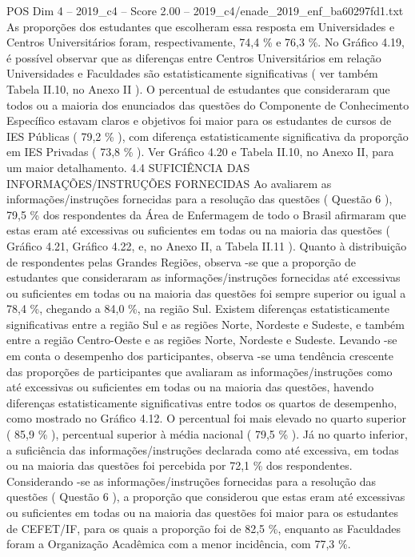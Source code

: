 \begin{textsample}{POS Dim 4 – 2019\_c4 – Score 2.00 – 2019\_c4/enade\_2019\_enf\_ba60297fd1.txt}
As proporções dos estudantes que escolheram essa resposta em Universidades e Centros Universitários foram, respectivamente, 74,4 \% e 76,3 \%.
No Gráfico 4.19, é possível observar que as diferenças entre Centros Universitários em relação Universidades e Faculdades são estatisticamente significativas ( ver também Tabela II.10, no Anexo II ).
O percentual de estudantes que consideraram que todos ou a maioria dos enunciados das questões do Componente de Conhecimento Específico estavam claros e objetivos foi maior para os estudantes de cursos de IES Públicas ( 79,2 \% ), com diferença estatisticamente significativa da proporção em IES Privadas ( 73,8 \% ).
Ver Gráfico 4.20 e Tabela II.10, no Anexo II, para um maior detalhamento. 4.4 SUFICIÊNCIA DAS INFORMAÇÕES/INSTRUÇÕES FORNECIDAS Ao avaliarem as informações/instruções fornecidas para a resolução das questões ( Questão 6 ), 79,5 \% dos respondentes da Área de Enfermagem de todo o Brasil afirmaram que estas eram até excessivas ou suficientes em todas ou na maioria das questões ( Gráfico 4.21, Gráfico 4.22, e, no Anexo II, a Tabela II.11 ).
Quanto à distribuição de respondentes pelas Grandes Regiões, observa -se que a proporção de estudantes que consideraram as informações/instruções fornecidas até excessivas ou suficientes em todas ou na maioria das questões foi sempre superior ou igual a 78,4 \%, chegando a 84,0 \%, na região Sul.
Existem diferenças estatisticamente significativas entre a região Sul e as regiões Norte, Nordeste e Sudeste, e também entre a região Centro-Oeste e as regiões Norte, Nordeste e Sudeste.
Levando -se em conta o desempenho dos participantes, observa -se uma tendência crescente das proporções de participantes que avaliaram as informações/instruções como até excessivas ou suficientes em todas ou na maioria das questões, havendo diferenças estatisticamente significativas entre todos os quartos de desempenho, como mostrado no Gráfico 4.12.
O percentual foi mais elevado no quarto superior ( 85,9 \% ), percentual superior à média nacional ( 79,5 \% ).
Já no quarto inferior, a suficiência das informações/instruções declarada como até excessiva, em todas ou na maioria das questões foi percebida por 72,1 \% dos respondentes.
Considerando -se as informações/instruções fornecidas para a resolução das questões ( Questão 6 ), a proporção que considerou que estas eram até excessivas ou suficientes em todas ou na maioria das questões foi maior para os estudantes de CEFET/IF, para os quais a proporção foi de 82,5 \%, enquanto as Faculdades foram a Organização Acadêmica com a menor incidência, com 77,3 \%.

\end{textsample}
